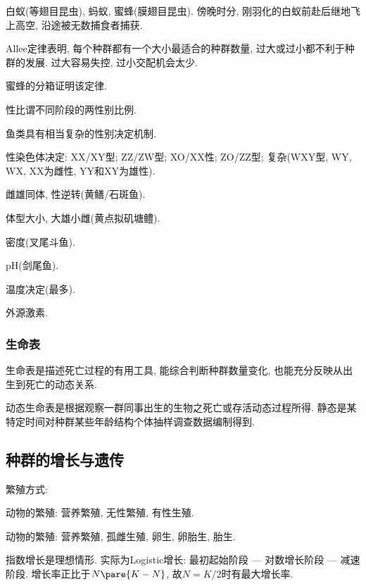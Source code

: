 \documentclass{ctexart}
\begin{document}
\begin{ex}
    白蚁(等翅目昆虫), 蚂蚁, 蜜蜂(膜翅目昆虫). 傍晚时分, 刚羽化的白蚁前赴后继地飞上高空, 沿途被无数捕食者捕获. 
\end{ex}
Allee定律表明, 每个种群都有一个大小最适合的种群数量, 过大或过小都不利于种群的发展. 过大容易失控, 过小交配机会太少.
\begin{ex}
    蜜蜂的分箱证明该定律.
\end{ex}
性比谓不同阶段的两性别比例.
\par
鱼类具有相当复杂的性别决定机制.
\begin{cenum}
    \item 性染色体决定: XX/XY型; ZZ/ZW型; XO/XX性; ZO/ZZ型; 复杂(WXY型, WY, WX, XX为雌性, YY和XY为雄性).
    \item 雌雄同体, 性逆转(黄鳝/石斑鱼).
    \item 体型大小, 大雄小雌(黄点拟矶塘鳢).
    \item 密度(叉尾斗鱼).
    \item pH(剑尾鱼).
    \item 温度决定(最多).
    \item 外源激素.
\end{cenum}

\subsubsection{生命表} %
\label{ssub:生命表}

生命表是描述死亡过程的有用工具, 能综合判断种群数量变化, 也能充分反映从出生到死亡的动态关系.
\par
动态生命表是根据观察一群同事出生的生物之死亡或存活动态过程所得. 静态是某特定时间对种群某些年龄结构个体抽样调查数据编制得到.



\subsection{种群的增长与遗传} %
\label{sub:种群的增长与遗传}

繁殖方式:
\begin{cenum}
    \item 动物的繁殖: 营养繁殖, 无性繁殖, 有性生殖.
    \item 动物的繁殖: 营养繁殖, 孤雌生殖, 卵生, 卵胎生, 胎生.
\end{cenum}
指数增长是理想情形. 实际为Logistic增长: 最初起始阶段 --- 对数增长阶段 --- 减速阶段. 增长率正比于$N\pare{K-N}$, 故$N=K/2$时有最大增长率.
\end{document}
